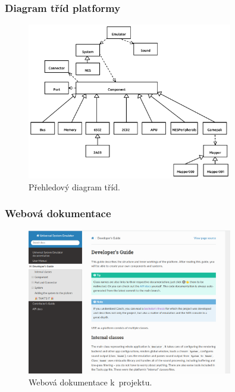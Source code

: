 \documentclass{beamer}
\begin{document}
\begin{frame}
	\frametitle{Diagram tříd platformy}
	\begin{figure}
		\centering
		\includegraphics[width=0.8\textwidth]{images/navrh_prehled.pdf}
		\caption{\normalsize Přehledový diagram tříd.}
	\end{figure}
\end{frame}
	
\begin{frame}
	\frametitle{Webová dokumentace}
	\begin{figure}
		\centering
		\includegraphics[width=0.8\textwidth]{images/docs.png}
		\caption{\normalsize Webová dokumentace k~projektu.}
	\end{figure}
\end{frame}
	
\end{document}
